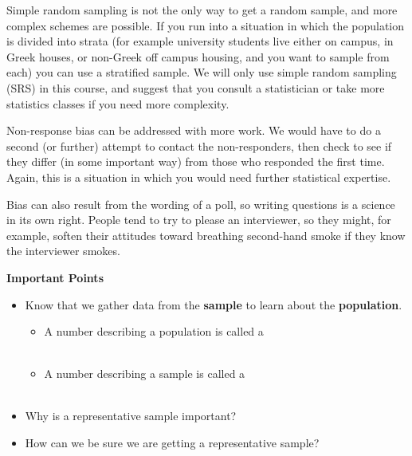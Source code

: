   Simple random sampling is not the only way to get a random
  sample, and more complex schemes are possible.  If you run into a
  situation in which the population is divided into strata (for
  example university students live either on campus, in Greek houses,
  or non-Greek off campus housing, and you want to sample from each)
  you can use a stratified sample.  We will only use simple random
  sampling (SRS) in this course, and suggest that you consult a
  statistician or take more statistics classes if you need more
  complexity. 

 Non-response bias can be addressed with more work.  We would have to
 do a second (or further) attempt to contact the non-responders, then 
 check to see if they differ (in some important way) from those who
 responded the first time.  Again, this is a situation in which you
 would need further statistical expertise.

 Bias can also result from the wording of a poll, so writing questions
 is a science in its own right.  People tend to try
 to please an interviewer, so they might, for example, soften their
 attitudes toward breathing second-hand smoke if they know the interviewer
 smokes. 


 \begin{center}
   {\large\bf Important Points}
 \end{center}
 \begin{itemize}
 \item Know that we gather data from the {\bf sample} to learn about
   the {\bf population}.
   \begin{itemize}
   \item A number describing a population is called a  \\ \\
   \item A number describing a sample is called a  \\ \\
   \end{itemize}
 \item Why is a representative sample important? \\
 \item How can we be sure we are getting a representative sample?
 \end{itemize}
